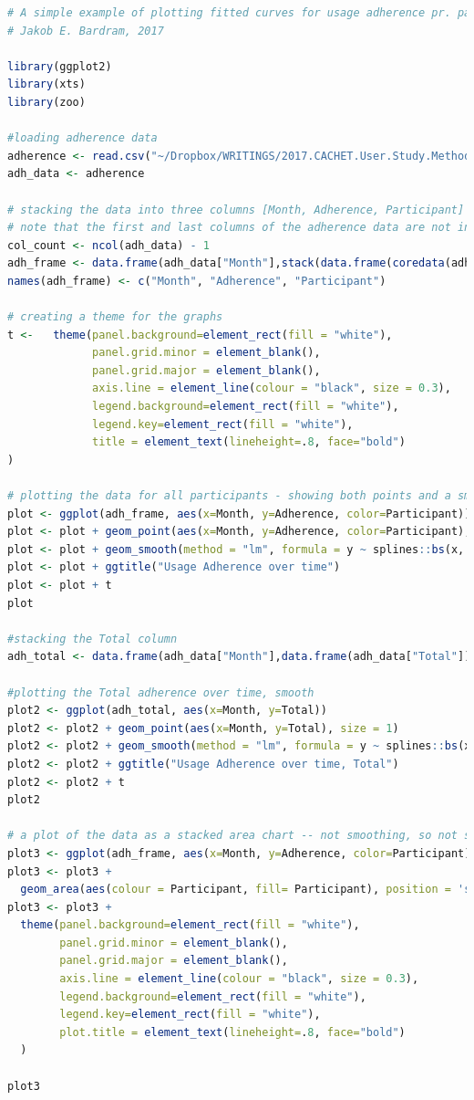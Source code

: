\begin{lstlisting}[language=R]
# A simple example of plotting fitted curves for usage adherence pr. participant and in total
# Jakob E. Bardram, 2017

library(ggplot2)
library(xts)
library(zoo)

#loading adherence data
adherence <- read.csv("~/Dropbox/WRITINGS/2017.CACHET.User.Study.Methodology/method/adherence.csv", sep=";")
adh_data <- adherence

# stacking the data into three columns [Month, Adherence, Participant] which is to be used by ggplot next
# note that the first and last columns of the adherence data are not included (Month and Total)
col_count <- ncol(adh_data) - 1
adh_frame <- data.frame(adh_data["Month"],stack(data.frame(coredata(adh_data[c(2:col_count)]))))
names(adh_frame) <- c("Month", "Adherence", "Participant")

# creating a theme for the graphs
t <-   theme(panel.background=element_rect(fill = "white"),
             panel.grid.minor = element_blank(),
             panel.grid.major = element_blank(),
             axis.line = element_line(colour = "black", size = 0.3),
             legend.background=element_rect(fill = "white"),
             legend.key=element_rect(fill = "white"),
             title = element_text(lineheight=.8, face="bold")
)

# plotting the data for all participants - showing both points and a smooth 'spline' trend line 
plot <- ggplot(adh_frame, aes(x=Month, y=Adherence, color=Participant))
plot <- plot + geom_point(aes(x=Month, y=Adherence, color=Participant), size = 1)
plot <- plot + geom_smooth(method = "lm", formula = y ~ splines::bs(x, 4), se = FALSE)
plot <- plot + ggtitle("Usage Adherence over time")
plot <- plot + t
plot

#stacking the Total column
adh_total <- data.frame(adh_data["Month"],data.frame(adh_data["Total"]))

#plotting the Total adherence over time, smooth
plot2 <- ggplot(adh_total, aes(x=Month, y=Total))
plot2 <- plot2 + geom_point(aes(x=Month, y=Total), size = 1)
plot2 <- plot2 + geom_smooth(method = "lm", formula = y ~ splines::bs(x, 7), se = FALSE)
plot2 <- plot2 + ggtitle("Usage Adherence over time, Total")
plot2 <- plot2 + t
plot2

# a plot of the data as a stacked area chart -- not smoothing, so not so nice...
plot3 <- ggplot(adh_frame, aes(x=Month, y=Adherence, color=Participant))
plot3 <- plot3 + 
  geom_area(aes(colour = Participant, fill= Participant), position = 'stack')
plot3 <- plot3 + 
  theme(panel.background=element_rect(fill = "white"),
        panel.grid.minor = element_blank(),
        panel.grid.major = element_blank(),
        axis.line = element_line(colour = "black", size = 0.3),
        legend.background=element_rect(fill = "white"),
        legend.key=element_rect(fill = "white"),
        plot.title = element_text(lineheight=.8, face="bold")
  )

plot3

\end{lstlisting}

